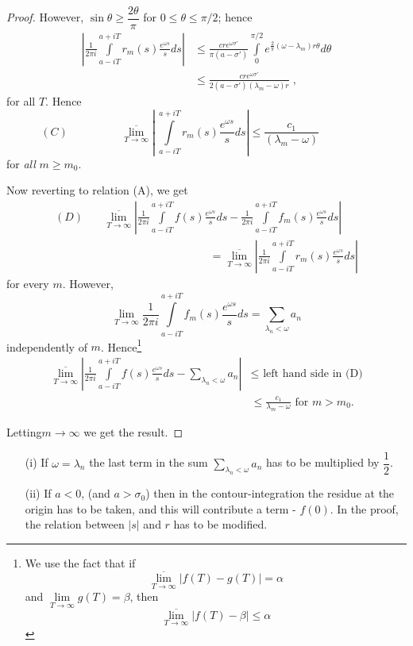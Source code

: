 \begin{proof}
However, $\sin \theta \geq \dfrac{2\theta}{\pi}$ for $0 \leq \theta
\leq \pi/2$; hence
\begin{align*}
\left|\frac{1}{2\pi i} \int\limits^{a+iT}_{a-iT} r_m(s)
\frac{e^{\omega s}}{s} ds \right| & \leq \frac{cr e^{\omega
    \sigma'}}{\pi(a-\sigma')} \int\limits^{\pi/2}_0
e^{\frac{2}{\pi}(\omega - \lambda_m)r\theta} d\theta\\
& \leq \frac{cr e^{\omega \sigma'}}{2(a-\sigma')(\lambda_m -\omega)r} \; ,
\end{align*}
for all $T$. Hence
$$
(C) \hspace{2cm} \overline{\lim\limits_{T\to\infty}}
\left|~\int\limits^{a+iT}_{a-iT} r_m(s) \frac{e^{\omega s}}{s}
ds\right|  \leq \frac{c_1}{(\lambda_m - \omega)}
\hspace{2cm}
$$\pageoriginale 
for \textit{all} $m \geq m_0$.

Now reverting to relation (A), we get
\begin{align*}
(D) \quad &\overline{\lim\limits_{T \to \infty}} \left|\frac{1}{2\pi i}
\int\limits^{a+iT}_{a-iT} f(s) \frac{e^{\omega s}}{s}  ds -
\frac{1}{2\pi i} \int\limits^{a+iT}_{a-iT} f_m (s) \frac{e^{\omega
    s}}{s} ds\right|\\  
&\hspace{4cm} = \overline{\lim\limits_{T\to \infty}} \left|
\frac{1}{2\pi i} \int\limits^{a+iT}_{a-iT} r_m(s) \frac{e^{\omega
    s}}{s} ds\right| 
\end{align*}
for every $m$. However,
$$ 
\lim\limits_{T\to\infty} \frac{1}{2\pi i}
\int\limits^{a+iT}_{a-iT} f_m(s) \frac{e^{\omega s}}{s} ds
=\sum\limits_{\lambda_n < \omega} a_n
$$
independently of $m$. Hence\footnote{We use the fact that if 
$$
\overline{\lim\limits_{T \to \infty}} |f(T) - g(T)| = \alpha
$$
and $\lim\limits_{T\to\infty} g(T) = \beta$, then
$$
\overline{\lim\limits_{T\to\infty}} |f(T)-\beta| \leq \alpha 
$$}
\begin{align*}
 \overline{\lim\limits_{T \to \infty} } \left| \frac{1}{2\pi i} \int\limits^{a+iT}_{a-iT} f(s)  \frac{e^{\omega s}}{s} ds  - \sum\limits_{\lambda_n < \omega} a_n \right| &\leq \text{ left hand side in (D)}\\
& \leq \frac{c_1}{\lambda_m - \omega} \text{ for } m > m_0. 
\end{align*}

Letting\pageoriginale $m \to \infty$ we get the result. 
\end{proof}

\begin{remarks*}
\begin{itemize}
\item[{\rm (i)}] If $\omega = \lambda_n$ the last term in the sum
  $\sum\limits_{\lambda_n < \omega}a_n$ has to be multiplied by
  $\dfrac{1}{2}$.

\item[(ii)] If $a<0$, (and $a>\sigma_0$) then in the
  contour-integration the residue at the origin has to be taken, and
  this will contribute a term - $f(0)$. In the proof, the relation
  between $|s|$ and $r$ has to be modified. 
\end{itemize}
\end{remarks*}

